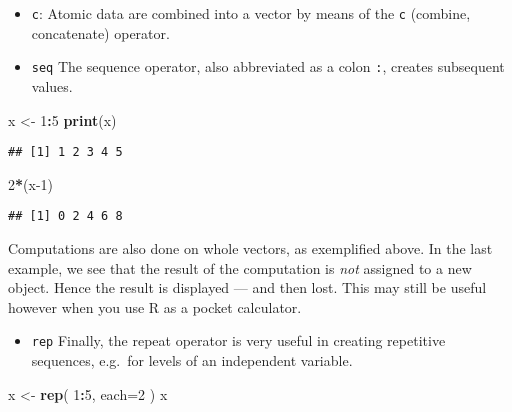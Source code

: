 \documentclass[]{book}
\newenvironment{Shaded}{\begin{snugshade}}{\end{snugshade}}
\newcommand{\DataTypeTok}[1]{\textcolor[rgb]{0.13,0.29,0.53}{#1}}
\newcommand{\DecValTok}[1]{\textcolor[rgb]{0.00,0.00,0.81}{#1}}
\newcommand{\KeywordTok}[1]{\textcolor[rgb]{0.13,0.29,0.53}{\textbf{#1}}}
\newcommand{\NormalTok}[1]{#1}
\newcommand{\OperatorTok}[1]{\textcolor[rgb]{0.81,0.36,0.00}{\textbf{#1}}}
\newcommand{\StringTok}[1]{\textcolor[rgb]{0.31,0.60,0.02}{#1}}
\providecommand{\tightlist}{%
  \setlength{\itemsep}{0pt}\setlength{\parskip}{0pt}}
\begin{document}
\begin{itemize}
\item
  \texttt{c}: Atomic data are combined into a vector by means of the
  \texttt{c} (combine, concatenate) operator.
\item
  \texttt{seq} The sequence operator, also abbreviated as a colon
  \texttt{:}, creates subsequent values.
\end{itemize}

\begin{Shaded}
\begin{Highlighting}[]
\NormalTok{x <-}\StringTok{ }\DecValTok{1}\OperatorTok{:}\DecValTok{5}
\KeywordTok{print}\NormalTok{(x)}
\end{Highlighting}
\end{Shaded}

\begin{verbatim}
## [1] 1 2 3 4 5
\end{verbatim}

\begin{Shaded}
\begin{Highlighting}[]
\DecValTok{2}\OperatorTok{*}\NormalTok{(x}\DecValTok{-1}\NormalTok{)}
\end{Highlighting}
\end{Shaded}

\begin{verbatim}
## [1] 0 2 4 6 8
\end{verbatim}

Computations are also done on whole vectors, as exemplified above.
In the last example, we see that the result of the computation is
\emph{not} assigned to a new object. Hence the result is displayed ---
and then lost. This may still be useful however when you use
R as a pocket calculator.

\begin{itemize}
\tightlist
\item
  \texttt{rep} Finally, the repeat operator is very useful in creating repetitive
  sequences, e.g.~for levels of an independent variable.
\end{itemize}

\begin{Shaded}
\begin{Highlighting}[]
\NormalTok{x <-}\StringTok{ }\KeywordTok{rep}\NormalTok{( }\DecValTok{1}\OperatorTok{:}\DecValTok{5}\NormalTok{, }\DataTypeTok{each=}\DecValTok{2}\NormalTok{ )}
\NormalTok{x}
\end{Highlighting}
\end{Shaded}
\end{document}
